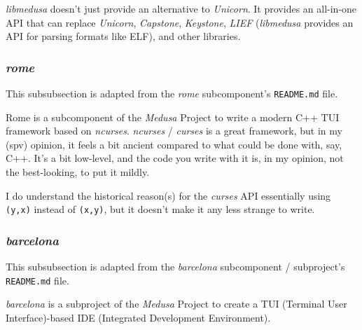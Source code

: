 \documentclass{article}
\begin{document}
	\textit{libmedusa} doesn't just provide an alternative to \textit{Unicorn}.
	It provides an all-in-one API that can replace \textit{Unicorn},
	\textit{Capstone}, \textit{Keystone}, \textit{LIEF} (\textit{libmedusa}
	provides an API for parsing formats like ELF), and other libraries.

	\subsubsection{\textit{rome}}
	This subsubsection is adapted from the \textit{rome} subcomponent's
	\texttt{README.md} file.

	Rome is a subcomponent of the \textit{Medusa} Project to write a modern C++
	TUI framework based on \textit{ncurses}. \textit{ncurses} / \textit{curses}
	is a great framework, but in my (spv) opinion, it feels a bit ancient
	compared to what could be done with, say, C++. It's a bit low-level, and the
	code you write with it is, in my opinion, not the best-looking, to put it
	mildly.

	I do understand the historical reason(s) for the \textit{curses} API
	essentially using \texttt{(y,x)} instead of \texttt{(x,y)}, but it doesn't
	make it any less strange to write.

	\subsubsection{\textit{barcelona}}
	This subsubsection is adapted from the \textit{barcelona} subcomponent /
	subproject's \texttt{README.md} file.

	\textit{barcelona} is a subproject of the \textit{Medusa} Project to create
	a TUI (Terminal User Interface)-based IDE (Integrated Development
	Environment).
\end{document}
